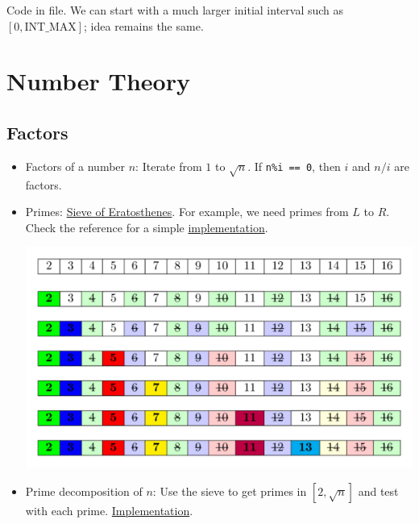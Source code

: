 \documentclass{article}
\newcommand{\T}[1]{\texttt{#1}}
\begin{document}
\begin{sloppypar}
\begin{itemize}
        \noindent Code in file. We can start with a much larger initial interval such as $[0,\text{INT\_MAX}]$; idea remains the same.
    \end{itemize}

    \newpage

    \section{Number Theory}

    \subsection{Factors}
    \begin{itemize}
        \item Factors of a number $n$: Iterate from $1$ to $\sqrt{n}$. If \T{n\%i == 0}, then $i$ and $n/i$ are factors.
        \item Primes: \href{https://cp-algorithms.com/algebra/sieve-of-eratosthenes.html}{Sieve of Eratosthenes}. For example, we need primes from $L$ to $R$. Check the reference for a simple \href{https://cp-algorithms.com/algebra/sieve-of-eratosthenes.html#implementation}{implementation}.
        \begin{center}
            \includegraphics[width = 0.8\linewidth]{../images/sieve_eratosthenes.png}
        \end{center}
        \item Prime decomposition of $n$: Use the sieve to get primes in $[2, \sqrt{n}]$ and test with each prime. \href{https://cp-algorithms.com/algebra/factorization.html#precomputed-primes}{Implementation}.
    \end{itemize}


\end{sloppypar}
\end{document}
